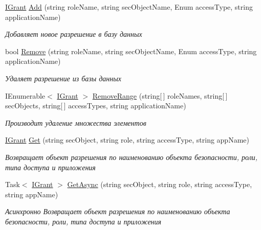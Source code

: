 \begin{DoxyCompactItemize}
\hyperlink{interface_security_1_1_interfaces_1_1_model_1_1_i_grant}{I\+Grant} \hyperlink{interface_security_1_1_interfaces_1_1_collections_1_1_i_grant_collection_a34810ab8c30b3562faf5a948a4367cfc}{Add} (string role\+Name, string sec\+Object\+Name, Enum access\+Type, string application\+Name)
\begin{DoxyCompactList}\small\item\em Добавляет новое разрешение в базу данных \end{DoxyCompactList}\item 
bool \hyperlink{interface_security_1_1_interfaces_1_1_collections_1_1_i_grant_collection_a8574918e9d609f37a3359a1f0dbd68a7}{Remove} (string role\+Name, string sec\+Object\+Name, Enum access\+Type, string application\+Name)
\begin{DoxyCompactList}\small\item\em Удаляет разрешение из базы данных \end{DoxyCompactList}\item 
I\+Enumerable$<$ \hyperlink{interface_security_1_1_interfaces_1_1_model_1_1_i_grant}{I\+Grant} $>$ \hyperlink{interface_security_1_1_interfaces_1_1_collections_1_1_i_grant_collection_a7b70f5669576f49ce394c008552f38b7}{Remove\+Range} (string\mbox{[}$\,$\mbox{]} role\+Names, string\mbox{[}$\,$\mbox{]} sec\+Objects, string\mbox{[}$\,$\mbox{]} access\+Types, string application\+Name)
\begin{DoxyCompactList}\small\item\em Производит удаление множества элементов \end{DoxyCompactList}\item 
\hyperlink{interface_security_1_1_interfaces_1_1_model_1_1_i_grant}{I\+Grant} \hyperlink{interface_security_1_1_interfaces_1_1_collections_1_1_i_grant_collection_a7fd330bfc10e8019ac67cd3639d914f5}{Get} (string sec\+Object, string role, string access\+Type, string app\+Name)
\begin{DoxyCompactList}\small\item\em Возвращает объект разрешения по наименованию объекта безопасности, роли, типа доступа и приложения \end{DoxyCompactList}\item 
Task$<$ \hyperlink{interface_security_1_1_interfaces_1_1_model_1_1_i_grant}{I\+Grant} $>$ \hyperlink{interface_security_1_1_interfaces_1_1_collections_1_1_i_grant_collection_a6a22b973fa4b30b1972f2cca5ce3c805}{Get\+Async} (string sec\+Object, string role, string access\+Type, string app\+Name)
\begin{DoxyCompactList}\small\item\em Асинхронно Возвращает объект разрешения по наименованию объекта безопасности, роли, типа доступа и приложения \end{DoxyCompactList}\end{DoxyCompactItemize}


